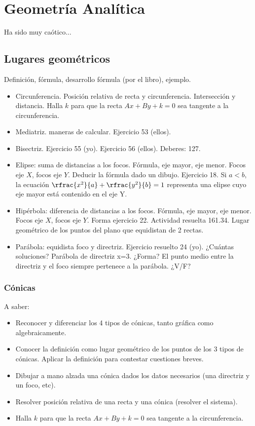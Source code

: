 \documentclass[palatino,nosec]{Docencia}
\begin{document}
\section{Geometría Analítica}

Ha sido muy caótico...


\subsection{Lugares geométricos}

Definición, fórmula, desarrollo fórmula (por el libro), ejemplo.

\begin{itemize}
	\item Circunferencia.
	\subitem Posición relativa de recta y circunferencia. Intersección y distancia.
	\subitem Halla $k$ para que la recta $Ax+By+k=0$ sea tangente a la circunferencia.
	\item Mediatriz.
	 maneras de calcular. Ejercicio 53 (ellos).
	\item Bisectriz. 
	\subitem Ejercicio 55 (yo).
	\subitem Ejercicio 56 (ellos).
	\subitem Deberes: 127.
	\item Elipse: suma de distancias a los focos.
	\subitem Fórmula, eje mayor, eje menor.
	\subitem Focos eje $X$, focos eje $Y$.
	\subitem Deducir la fórmula dado un dibujo.
	\subitem Ejercicio 18.
	\subitem Si $a<b$, la ecuación $\rfrac{x^2}{a} + \rfrac{y^2}{b} = 1$ representa una elipse cuyo eje mayor está contenido en el eje Y.
	\item Hipérbola: diferencia de distancias a los focos.
	\subitem Fórmula, eje mayor, eje menor.
	\subitem Focos eje $X$, focos eje $Y$.
	\subitem Forma ejercicio 22.
	\subitem Actividad resuelta 161.34.
	\subitem Lugar geométrico de los puntos del plano que equidistan de 2 rectas.
	\item Parábola: equidista foco y directriz.
	\subitem Ejercicio resuelto 24 (yo). ¿Cuántas soluciones?
	\subitem Parábola de directriz x=3. ¿Forma?
	\subitem El punto medio entre la directriz y el foco siempre pertenece a la parábola. ¿V/F?
\end{itemize}

\subsubsection{Cónicas}
A saber:
\begin{itemize}
	\item Reconocer y diferenciar los 4 tipos de cónicas, tanto gráfica como algebraicamente.
	\item Conocer la definición como lugar geométrico de los puntos de los 3 tipos de cónicas.
	\subitem Aplicar la definición para contestar cuestiones breves.
	\item Dibujar a mano alzada una cónica dados los datos necesarios (una directriz y un foco, etc).
	\item Resolver posición relativa de una recta y una cónica (resolver el sistema).
	\item Halla $k$ para que la recta $Ax+By+k=0$ sea tangente a la circunferencia.

\end{itemize}
\end{document}

